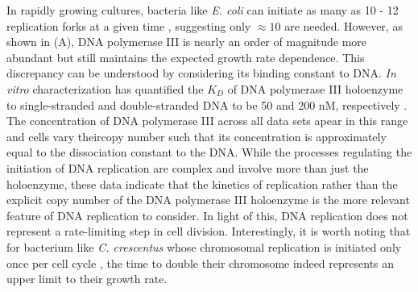 In rapidly growing cultures, bacteria like \textit{E. coli} can initiate as many
as 10 - 12 replication forks at a given time \citep{bremer2008, si2017},
suggesting  only $\approx 10$ are needed. However, as shown in
(A), DNA polymerase III is nearly an order of magnitude more
abundant but still maintains the expected growth rate dependence. This
discrepancy can be  understood by considering its binding constant to DNA.
\textit{In vitro} characterization has quantified the $K_D$ of DNA polymerase
III holoenzyme to single-stranded and double-stranded DNA to be 50 and 200 nM,
respectively \citep{ason2000}. The concentration of DNA polymerase III across
all data sets apear in this range and cells vary theircopy number such that its
concentration is approximately equal to the dissociation constant to the DNA.
While the processes regulating the initiation of DNA replication are complex and
involve more than just the holoenzyme, these data indicate that the kinetics of
replication rather than the explicit copy number of the DNA polymerase III
holoenzyme is the more relevant feature of DNA replication to consider. In light
of this, DNA replication does not represent a rate-limiting step in
cell division. Interestingly, it is worth noting that for bacterium like \textit{C.
crescentus} whose chromosomal replication is initiated only once per cell cycle
\citep{jensen2001}, the time to double their chromosome indeed represents an
upper limit to their growth rate.
